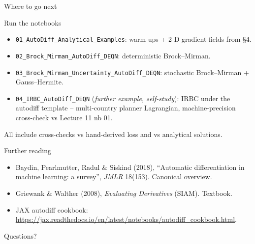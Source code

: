 \documentclass[aspectratio=169,11pt]{beamer}
\begin{document}
\begin{frame}[fragile]{Where to go next}
\footnotesize
\begin{block}{Run the notebooks}
\begin{itemize}\itemsep1pt
\item \texttt{01\_AutoDiff\_Analytical\_Examples}: warm-ups + 2-D gradient fields from \S 4.
\item \texttt{02\_Brock\_Mirman\_AutoDiff\_DEQN}: deterministic Brock--Mirman.
\item \texttt{03\_Brock\_Mirman\_Uncertainty\_AutoDiff\_DEQN}: stochastic Brock--Mirman + Gauss--Hermite.
\item \texttt{04\_IRBC\_AutoDiff\_DEQN} (\emph{further example, self-study}): IRBC under the autodiff template -- multi-country planner Lagrangian, machine-precision cross-check vs Lecture 11 nb 01.
\end{itemize}
All include cross-checks vs hand-derived loss and vs analytical solutions.
\end{block}
\begin{block}{Further reading}
\begin{itemize}\itemsep1pt
\item Baydin, Pearlmutter, Radul \& Siskind (2018), ``Automatic differentiation in machine learning: a survey'', \emph{JMLR} 18(153). Canonical overview.
\item Griewank \& Walther (2008), \emph{Evaluating Derivatives} (SIAM). Textbook.
\item JAX autodiff cookbook: \url{https://jax.readthedocs.io/en/latest/notebooks/autodiff_cookbook.html}.
\end{itemize}
\end{block}
\centerline{Questions?}
\end{frame}
\end{document}
